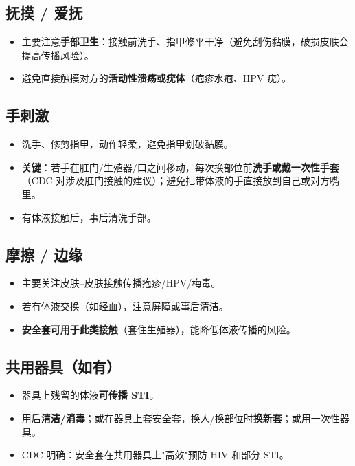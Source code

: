 \subsection*{抚摸 / 爱抚}

\begin{itemize}[leftmargin=2em]
  \item 主要注意\textbf{手部卫生}：接触前洗手、指甲修平干净（避免刮伤黏膜，破损皮肤会提高传播风险）。
  \item 避免直接触摸对方的\textbf{活动性溃疡或疣体}（疱疹水疱、HPV 疣）。
\end{itemize}

\subsection*{手刺激}

\begin{itemize}[leftmargin=2em]
  \item 洗手、修剪指甲，动作轻柔，避免指甲划破黏膜。
  \item \textbf{关键}：若手在肛门/生殖器/口之间移动，每次换部位前\textbf{洗手或戴一次性手套}
        （CDC 对涉及肛门接触的建议）；避免把带体液的手直接放到自己或对方嘴里。
  \item 有体液接触后，事后清洗手部。
\end{itemize}

\subsection*{摩擦 / 边缘}

\begin{itemize}[leftmargin=2em]
  \item 主要关注皮肤--皮肤接触传播疱疹/HPV/梅毒。
  \item 若有体液交换（如经血），注意屏障或事后清洁。
  \item \textbf{安全套可用于此类接触}（套住生殖器），能降低体液传播的风险。
\end{itemize}

\subsection*{共用器具（如有）}

\begin{itemize}[leftmargin=2em]
  \item 器具上残留的体液\textbf{可传播 STI}。
  \item 用后\textbf{清洁/消毒}；或在器具上套安全套，换人/换部位时\textbf{换新套}；或用一次性器具。
  \item CDC 明确：安全套在共用器具上"高效"预防 HIV 和部分 STI。
\end{itemize}

